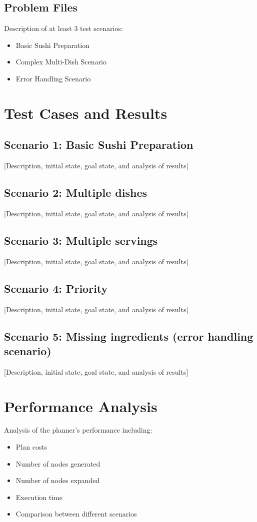 \documentclass{article}
\begin{document}
\subsection{Problem Files}
Description of at least 3 test scenarios:
\begin{itemize}
    \item Basic Sushi Preparation
    \item Complex Multi-Dish Scenario
    \item Error Handling Scenario
\end{itemize}

\section{Test Cases and Results}
\subsection{Scenario 1: Basic Sushi Preparation}
[Description, initial state, goal state, and analysis of results]

\subsection{Scenario 2: Multiple dishes}
[Description, initial state, goal state, and analysis of results]

\subsection{Scenario 3: Multiple servings}
[Description, initial state, goal state, and analysis of results]

\subsection{Scenario 4: Priority}
[Description, initial state, goal state, and analysis of results]

\subsection{Scenario 5: Missing ingredients (error handling scenario)}
[Description, initial state, goal state, and analysis of results]

\section{Performance Analysis}
Analysis of the planner's performance including:
\begin{itemize}
    \item Plan costs
    \item Number of nodes generated
    \item Number of nodes expanded
    \item Execution time
    \item Comparison between different scenarios
\end{itemize}
\end{document}
